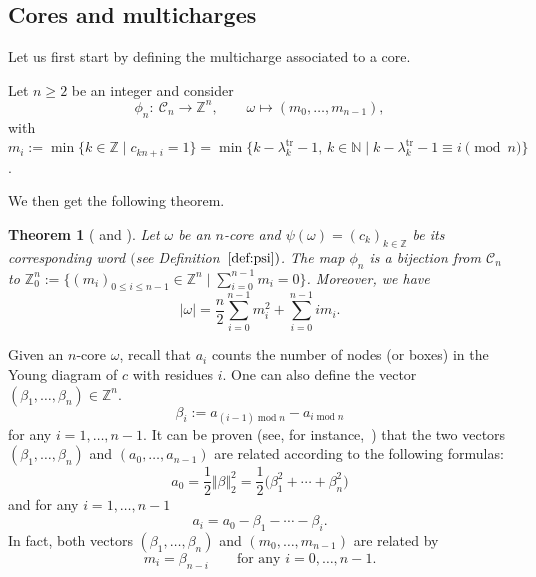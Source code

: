 \documentclass[10pt,a4paper]{amsart}
\newtheorem{Theorem}{Theorem}[section]
\numberwithin{equation}{section}
\newcommand{\cC}{\mathcal{C}}
\newcommand{\Z}{\mathbb{Z}}
\newcommand{\N}{\mathbb{N}}
\newcommand{\func}[1]{\operatorname{#1}}
\begin{document}
\subsection{Cores and multicharges}

Let us first start by defining the multicharge associated to a core.

\begin{Definition}
	\label{defgks} Let $n\geq 2$ be an integer and consider
	\begin{equation*}
	\phi _{n}\colon \ \mathcal{C}_{n}   \rightarrow   \Z^{n}, \qquad
	  \omega   \mapsto   (m_{0},\dots ,m_{n-1}),
	\end{equation*}
	with $m_{i}:=\min \{k\in \Z\mid c_{kn+i}=1\}=\min \bigl\{k-\lambda _{k}^{\mathrm{tr}}-1,\, k\in \N\mid k-\lambda _{k}^{\mathrm{tr}}-1\equiv i\pmod{n}\bigr\}$.
\end{Definition}

We then get the following theorem.

\begin{Theorem}[{\cite[Theorem $2.10$]{Johnson}} and {\cite[Bijection $2$]{GKS}}]\label{thm:gk}
    Let $\omega $ be an $n$-core and $\psi (\omega )=( c_{k}) _{k\in \Z}$
	be its corresponding word $($see Definition~$\ref{def:psi})$. The map $\phi _{n}$
	is a bijection from $\cC_{n}$ to {$\Z_{0}^{n}:=\bigl\{(m_{i})_{0\leq i\leq n-1}\in %
	\Z^{n}\mid \sum_{i=0}^{n-1}m_{i}=0\bigr\}$}. Moreover, we have
	\begin{equation*}
	\lvert \omega \rvert =\frac{n}{2}\sum_{i=0}^{n-1}m_{i}^{2}+%
	\sum_{i=0}^{n-1}im_{i}. %
	\end{equation*}
\end{Theorem}

Given an $n$-core $\omega $, recall that $a_{i}$ counts the number of nodes
(or boxes) in the Young diagram of $c$ with residues $i$. One can also
define the vector $(\beta _{1},\dots ,\beta _{n})\in \mathbb{Z}^{n}$.
\begin{equation}
\beta _{i}:=a_{(i-1)\func{mod}n}-a_{i\func{mod}n} \label{eq:beta_a}
\end{equation}
for any $i=1,\dots ,n-1$.
It can be proven (see, for instance,~\cite{Rost}) that the two vectors $%
(\beta _{1},\dots ,\beta _{n})$ and $(a_{0},\dots ,a_{n-1})$ are related
according to the following formulas:
\begin{equation*}
a_{0}=\frac{1}{2} \Vert \beta  \Vert _{2}^{2}=\frac{1}{2}\bigl(\beta
_{1}^{2}+\cdots +\beta _{n}^{2}\bigr)
\end{equation*}
and for any $i=1,\dots ,n-1$
\begin{equation*}
a_{i}=a_{0}-\beta _{1}-\cdots -\beta _{i}.
\end{equation*}
In fact, both vectors $(\beta _{1},\dots ,\beta _{n})$ and $
(m_{0},\dots ,m_{n-1})$ are related by%
\begin{equation*}
m_{i}=\beta _{n-i}\qquad \text{for any }i=0,\dots ,n-1.
\end{equation*}
\end{document}
